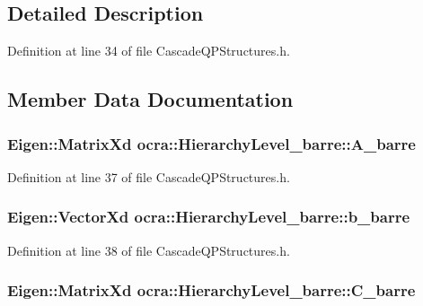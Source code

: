 \subsection{Detailed Description}


Definition at line 34 of file Cascade\+Q\+P\+Structures.\+h.



\subsection{Member Data Documentation}
\subsubsection[{\texorpdfstring{A\+\_\+barre}{A_barre}}]{\setlength{\rightskip}{0pt plus 5cm}Eigen\+::\+Matrix\+Xd ocra\+::\+Hierarchy\+Level\+\_\+barre\+::\+A\+\_\+barre}\hypertarget{structocra_1_1HierarchyLevel__barre_a9e0797af20a5547e4c7b88d648e9a152}{}\label{structocra_1_1HierarchyLevel__barre_a9e0797af20a5547e4c7b88d648e9a152}


Definition at line 37 of file Cascade\+Q\+P\+Structures.\+h.

\subsubsection[{\texorpdfstring{b\+\_\+barre}{b_barre}}]{\setlength{\rightskip}{0pt plus 5cm}Eigen\+::\+Vector\+Xd ocra\+::\+Hierarchy\+Level\+\_\+barre\+::b\+\_\+barre}\hypertarget{structocra_1_1HierarchyLevel__barre_a4b34116dea6da686e3b491a673adabde}{}\label{structocra_1_1HierarchyLevel__barre_a4b34116dea6da686e3b491a673adabde}


Definition at line 38 of file Cascade\+Q\+P\+Structures.\+h.

\subsubsection[{\texorpdfstring{C\+\_\+barre}{C_barre}}]{\setlength{\rightskip}{0pt plus 5cm}Eigen\+::\+Matrix\+Xd ocra\+::\+Hierarchy\+Level\+\_\+barre\+::\+C\+\_\+barre}\hypertarget{structocra_1_1HierarchyLevel__barre_a3d60346fbdc2ff5c366b6b5f7b802af1}{}\label{structocra_1_1HierarchyLevel__barre_a3d60346fbdc2ff5c366b6b5f7b802af1}



